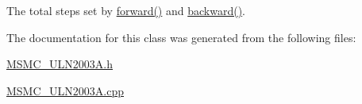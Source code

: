 The total steps set by \hyperlink{class_m_s_m_c___u_l_n2003_a_a9657492f948a75472b311bc0b823899f}{forward()} and \hyperlink{class_m_s_m_c___u_l_n2003_a_ac46e6ec6345f95b534079bcf2920885e}{backward()}. 



The documentation for this class was generated from the following files\+:\begin{DoxyCompactItemize}
\item 
\hyperlink{_m_s_m_c___u_l_n2003_a_8h}{M\+S\+M\+C\+\_\+\+U\+L\+N2003\+A.\+h}\item 
\hyperlink{_m_s_m_c___u_l_n2003_a_8cpp}{M\+S\+M\+C\+\_\+\+U\+L\+N2003\+A.\+cpp}\end{DoxyCompactItemize}
